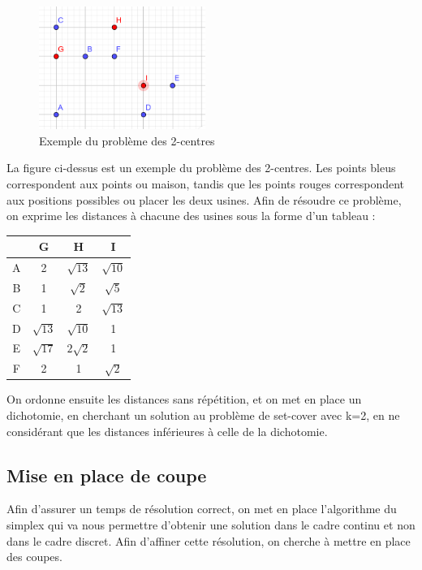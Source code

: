 \documentclass[12pt]{report}
\begin{document}
\begin{figure}[h!]
  \centering
  \includegraphics[height=4cm]{exemple_P_centre.png}
  \caption{Exemple du problème des 2-centres}
  \label{fig:2-Centre}
\end{figure}
La figure ci-dessus est un exemple du problème des 2-centres. Les points bleus correspondent aux points ou maison, tandis que les points rouges correspondent aux positions possibles ou placer les deux usines.
\newline
Afin de résoudre ce problème, on exprime les distances à chacune des usines sous la forme d'un tableau :
\begin{center}
\begin{tabular}{ | c | c | c | c | }
    \hline
    & G & H & I \\ \hline
    A & 2 & $\sqrt{13}$ & $\sqrt{10}$ \\ \hline
    B & 1 & $\sqrt{2}$ & $\sqrt{5}$ \\ \hline
    C & 1 & 2 & $\sqrt{13}$ \\ \hline
    D & $\sqrt{13}$ & $\sqrt{10}$ & 1 \\ \hline
    E & $\sqrt{17}$ & $2\sqrt{2}$ & 1 \\ \hline
    F & 2 & 1 & $\sqrt{2}$ \\ \hline
\end{tabular}
\end{center}
On ordonne ensuite les distances sans répétition, et on met en place un dichotomie, en cherchant un solution au problème de set-cover avec k=2, en ne considérant que les distances inférieures à celle de la dichotomie.

\subsection{Mise en place de coupe}
Afin d'assurer un temps de résolution correct, on met en place l'algorithme du simplex qui va nous permettre d'obtenir une solution dans le cadre continu et non dans le cadre discret. Afin d'affiner cette résolution, on cherche à mettre en place des coupes.
\end{document}
